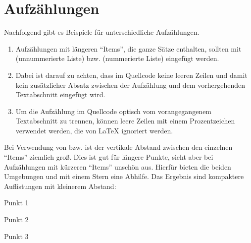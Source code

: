 \section{Aufzählungen}%
%
\label{sec:Aufzählungen}
%
Nachfolgend gibt es Beispiele für unterschiedliche Aufzählungen.
%
\begin{enumerate}
\item Aufzählungen mit längeren \enquote{Items}, die ganze Sätze enthalten, sollten mit  (unnummerierte Liste) bzw.  (nummerierte Liste) eingefügt werden.
\item Dabei ist darauf zu achten, dass im Quellcode keine leeren Zeilen und damit kein zusätzlicher Absatz zwischen der Aufzählung und dem vorhergehenden Textabschnitt eingefügt wird.
\item Um die Aufzählung im Quellcode optisch vom vorangegangenem Textabschnitt zu trennen, können leere Zeilen mit einem Prozentzeichen verwendet werden, die von \LaTeX{} ignoriert werden.
\end{enumerate}
%
Bei Verwendung von  bzw.  ist der vertikale Abstand zwischen den einzelnen \enquote{Items} ziemlich groß.
Dies ist gut für längere Punkte, sieht aber bei Aufzählungen mit kürzeren \enquote{Items} unschön aus.
Hierfür bieten die beiden Umgebungen  und  mit einem Stern eine Abhilfe.
Das Ergebnis sind kompaktere Auflistungen mit kleinerem Abstand:
%
\begin{itemize*}
\item Punkt 1
\item Punkt 2
\item Punkt 3
\end{itemize*}
